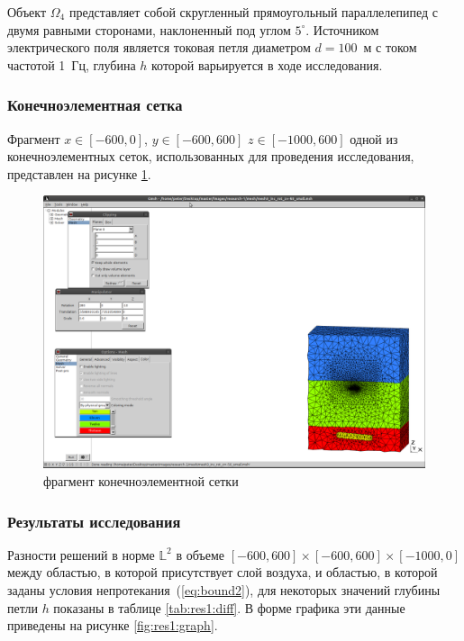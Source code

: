 \documentclass[a4paper,12pt]{article}
\begin{document}
\noindent Объект $\Omega_4$ представляет собой скругленный прямоугольный параллелепипед с двумя равными сторонами, наклоненный под углом $5^{\circ}$. Источником электрического поля является токовая петля диаметром $d=100$~м с током частотой 1~Гц, глубина $h$ которой варьируется в ходе исследования.

\subsubsection{Конечноэлементная сетка}
Фрагмент $x \in [-600,0]$, $y \in [-600,600]$ $z \in [-1000,600]$ одной из конечноэлементных сеток, использованных для проведения исследования, представлен на рисунке \ref{fig:res1:mesh}.

\begin{figure}[H]
	\centering
	\includegraphics[trim=390mm 20mm 5mm 195mm,clip,scale=0.45]{research-1/mesh/mesh.png}
	\caption{фрагмент конечноэлементной сетки}
	\label{fig:res1:mesh}
\end{figure}

\subsubsection{Результаты исследования}
Разности решений в норме $\mathbb{L}^2$ в объеме $[-600,600] \times [-600,600] \times [-1000,0]$ между областью, в которой присутствует слой воздуха, и областью, в которой заданы условия непротекания~(\ref{eq:bound2}), для некоторых значений глубины петли $h$ показаны в таблице \ref{tab:res1:diff}. В форме графика эти данные приведены на рисунке \ref{fig:res1:graph}.
\end{document}
